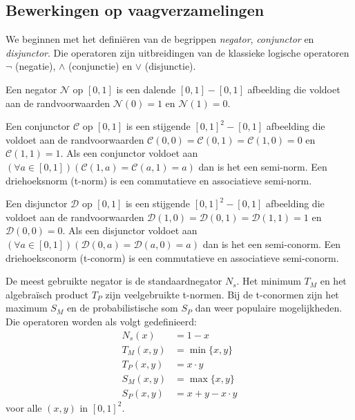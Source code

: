 \subsection{Bewerkingen op vaagverzamelingen}
\label{sectie:bew_op_vaagverz}

We beginnen met het defini\"eren van de begrippen \emph{negator}, \emph{conjunctor} en 
\emph{disjunctor}. Die operatoren zijn uitbreidingen van de klassieke logische operatoren
$\lnot$ (negatie), $\land$ (conjunctie) en $\lor$ (disjunctie).
\begin{definitie}
Een negator $\mathcal{N}$ op $[0,1]$ is een dalende $[0,1] - [0,1]$ afbeelding die voldoet
aan de randvoorwaarden $\mathcal{N}(0)=1$ en $\mathcal{N}(1)=0$. 
\end{definitie}
\begin{definitie}
Een conjunctor $\mathcal{C}$ op $[0,1]$ is een stijgende $[0,1]^2 - [0,1]$ afbeelding die voldoet aan de
randvoorwaarden $\mathcal{C}(0,0)=\mathcal{C}(0,1)=\mathcal{C}(1,0)=0$ en $\mathcal{C}(1,1)=1$. 
Als een conjunctor voldoet aan 
$(\forall a \in [0,1])(\mathcal{C}(1,a)=\mathcal{C}(a,1)=a)$ dan is het een semi-norm.
Een driehoeksnorm (t-norm) is een commutatieve en associatieve semi-norm.
\end{definitie}
\begin{definitie}
Een disjunctor $\mathcal{D}$ op $[0,1]$ is een stijgende $[0,1]^2 - [0,1]$ afbeelding die voldoet
aan de randvoorwaarden $\mathcal{D}(1,0)=\mathcal{D}(0,1)=\mathcal{D}(1,1)=1$ en 
$\mathcal{D}(0,0)=0$. Als een disjunctor voldoet aan 
$(\forall a \in [0,1])(\mathcal{D}(0,a)=\mathcal{D}(a,0)=a)$ dan is het een semi-conorm.
Een driehoeksconorm (t-conorm) is een commutatieve en associatieve semi-conorm.
\end{definitie}

De meest gebruikte negator is de standaardnegator $N_s$. Het minimum $T_M$ en het algebra\"isch 
product $T_P$ zijn veelgebruikte t-normen. Bij de t-conormen zijn het maximum $S_M$ en de
probabilistische som $S_P$ dan weer populaire mogelijkheden. Die operatoren worden als 
volgt gedefinieerd:
\begin{align*}
N_s(x) &= 1 - x \\
T_M(x,y) &= \min \{x,y\} \\
T_P(x,y) &= x \cdot y \\
S_M(x,y) &= \max \{x,y\} \\
S_P(x,y) &= x + y - x \cdot y
\end{align*}
voor alle $(x,y)$ in $[0,1]^2$.

